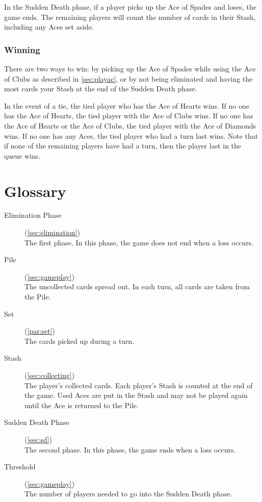 \documentclass{article}
\begin{document}
In the Sudden Death phase, if a player picks up the Ace of Spades and
loses, the game ends. The remaining players will count the number of
cards in their Stash, including any Aces set aside.

\subsubsection{Winning}

There are two ways to win: by picking up the Ace of Spades while using
the Ace of Clubs as described in \ref{sec:playac}, or by not being
eliminated and having the most cards your Stash at the end of the Sudden
Death phase.

In the event of a tie, the tied player who has the Ace of Hearts wins.
If no one has the Ace of Hearts, the tied player with the Ace of Clubs
wins. If no one has the Ace of Hearts or the Ace of Clubs, the tied
player with the Ace of Diamonds wins. If no one has any Aces, the tied
player who had a turn last wins. Note that if none of the remaining
players have had a turn, then the player last in the queue wins.

\section{Glossary}
\begin{description}
  \item[Elimination Phase](\ref{sec:elimination})\\
    The first phase. In this phase, the game does not end when a loss
    occurs.
  \item[Pile](\ref{sec:gameplay})\\
    The uncollected cards spread out. In each turn, all cards are taken
    from the Pile.
  \item[Set](\ref{par:set})\\
    The cards picked up during a turn.
  \item[Stash](\ref{sec:collecting})\\
    The player's collected cards. Each player's Stash is
    counted at the end of the game. Used Aces are put in the Stash and
    may not be played again until the Ace is returned to the Pile.
  \item[Sudden Death Phase](\ref{sec:sd})\\
    The second phase. In this phase, the game ends when a loss occurs.
  \item[Threshold](\ref{sec:gameplay})\\
    The number of players needed to go into the Sudden
    Death phase.
\end{description}
\end{document}
